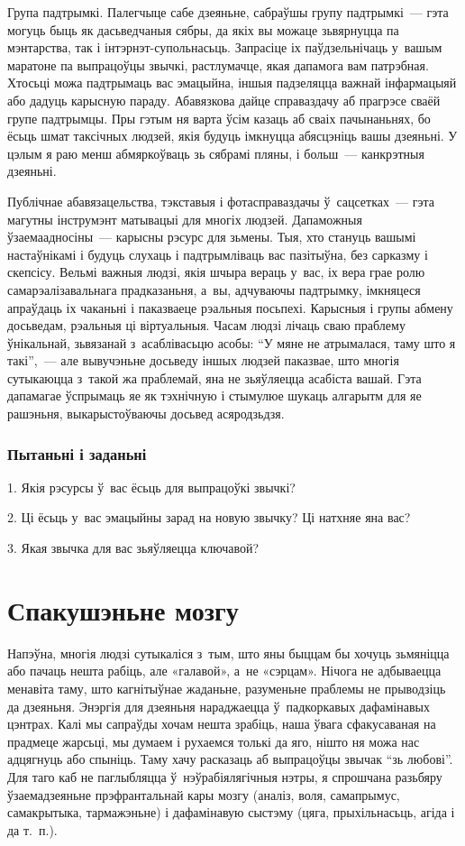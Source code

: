 Група падтрымкі. Палегчыце сабе дзеяньне, сабраўшы групу падтрымкі~--- гэта могуць быць як дасьведчаныя сябры, да якіх вы можаце зьвярнуцца па мэнтарства, так і інтэрнэт-супольнасьць. Запрасіце іх паўдзельнічаць у~вашым маратоне па выпрацоўцы звычкі, растлумачце, якая дапамога вам патрэбная. Хтосьці можа падтрымаць вас эмацыйна, іншыя падзеляцца важнай інфармацыяй або дадуць карысную параду. Абавязкова дайце справаздачу аб прагрэсе сваёй групе падтрымцы. Пры гэтым ня варта ўсім казаць аб сваіх пачынаньнях, бо ёсьць шмат таксічных людзей, якія будуць імкнуцца абясцэніць вашы дзеяньні. У цэлым я раю менш абмяркоўваць зь сябрамі пляны, і больш~--- канкрэтныя дзеяньні. 

Публічнае абавязацельства, тэкставыя і фотасправаздачы ў~сацсетках~--- гэта магутны інструмэнт матывацыі для многіх людзей. Дапаможныя ўзаемаадносіны~--- карысны рэсурс для зьмены. Тыя, хто стануць вашымі настаўнікамі і будуць слухаць і падтрымліваць вас пазітыўна, без сарказму і скепсісу. Вельмі важныя людзі, якія шчыра вераць у~вас, іх вера грае ролю самарэалізавальнага прадказаньня, а~вы, адчуваючы падтрымку, імкняцеся апраўдаць іх чаканьні і паказваеце рэальныя посьпехі. Карысныя і групы абмену досьведам, рэальныя ці віртуальныя. Часам людзі лічаць сваю праблему ўнікальнай, зьвязанай з~асаблівасьцю асобы: ``У мяне не атрымалася, таму што я такі'',~--- але вывучэньне досьведу іншых людзей паказвае, што многія сутыкаюцца з~такой жа праблемай, яна не зьяўляецца асабіста вашай. Гэта дапамагае ўспрымаць яе як тэхнічную і стымулюе шукаць алгарытм для яе рашэньня, выкарыстоўваючы досьвед асяродзьдзя.

\subsubsection{Пытаньні і заданьні}

1. Якія рэсурсы ў~вас ёсьць для выпрацоўкі звычкі?

2. Ці ёсьць у~вас эмацыйны зарад на новую звычку? Ці натхняе яна вас?

3. Якая звычка для вас зьяўляецца ключавой?


\section{Спакушэньне мозгу}

Напэўна, многія людзі сутыкаліся з~тым, што яны быццам бы хочуць зьмяніцца або пачаць нешта рабіць, але «галавой», а~не «сэрцам». Нічога не адбываецца менавіта таму, што кагнітыўнае жаданьне, разуменьне праблемы не прыводзіць да дзеяньня. Энэргія для дзеяньня нараджаецца ў~падкоркавых дафамінавых цэнтрах. Калі мы сапраўды хочам нешта зрабіць, наша ўвага сфакусаваная на прадмеце жарсьці, мы думаем і рухаемся толькі да яго, нішто ня можа нас адцягнуць або спыніць. Таму хачу расказаць аб выпрацоўцы звычак ``зь любові''. Для таго каб не паглыбляцца ў~нэўрабіялягічныя нэтры, я спрошчана разьбяру ўзаемадзеяньне прэфрантальнай кары мозгу (аналіз, воля, самапрымус, самакрытыка, тармажэньне) і дафамінавую сыстэму (цяга, прыхільнасьць, агіда і да т.~п.).

